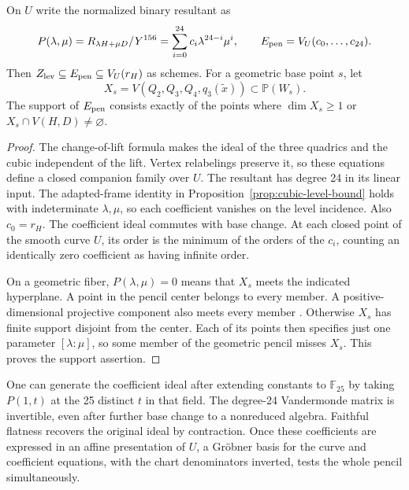 \begin{proposition}
\label{prop:level-pencil-scheme}
On \(U\) write the normalized binary resultant as
\[
 P(\lambda,\mu)=R_{\lambda H+\mu D}/Y^{156}
       =\sum_{i=0}^{24}c_i\lambda^{24-i}\mu^i,\qquad
 E_{\rm pen}=V_U(c_0,\ldots,c_{24}).
\]
Then \(Z_{\rm lev}\subseteq E_{\rm pen}\subseteq V_U(r_H)\) as
schemes. For a geometric base point \(s\), let
\[
 X_s=V(Q_2,Q_3,Q_4,q_3(\widetilde x))\subset\mathbb P(W_s).
\]
The support of \(E_{\rm pen}\) consists exactly of the points where
\(\dim X_s\ge1\) or \(X_s\cap V(H,D)\ne\varnothing\).
\end{proposition}

\begin{proof}
The change-of-lift formula makes the ideal of the three quadrics and
the cubic independent of the lift. Vertex relabelings preserve it, so
these equations define a closed companion family over \(U\).
The resultant has degree 24 in its linear input. The adapted-frame
identity in Proposition~\ref{prop:cubic-level-bound} holds with
indeterminate \(\lambda,\mu\), so each coefficient vanishes on the
level incidence. Also \(c_0=r_H\). The coefficient ideal commutes
with base change. At each closed point of the smooth curve \(U\),
its order is the minimum of the orders of the \(c_i\), counting an
identically zero coefficient as having infinite order.

On a geometric fiber, \(P(\lambda,\mu)=0\) means that \(X_s\) meets
the indicated hyperplane. A point in the pencil center belongs to
every member. A positive-dimensional projective component also meets
every member \cite{stacksProjectiveIntersection}. Otherwise \(X_s\)
has finite support disjoint from the center. Each of its points then
specifies just one parameter \([\lambda:\mu]\), so some member of the
geometric pencil misses \(X_s\). This proves the support assertion.
\end{proof}

One can generate the coefficient ideal after extending constants to
\(\mathbb F_{25}\) by taking \(P(1,t)\) at the 25 distinct \(t\) in
that field. The degree-24 Vandermonde matrix is invertible, even after
further base change to a nonreduced algebra. Faithful flatness recovers
the original ideal by contraction. Once these coefficients are expressed
in an affine presentation of \(U\), a Gröbner basis for the curve and
coefficient equations, with the chart denominators inverted, tests the
whole pencil simultaneously.

